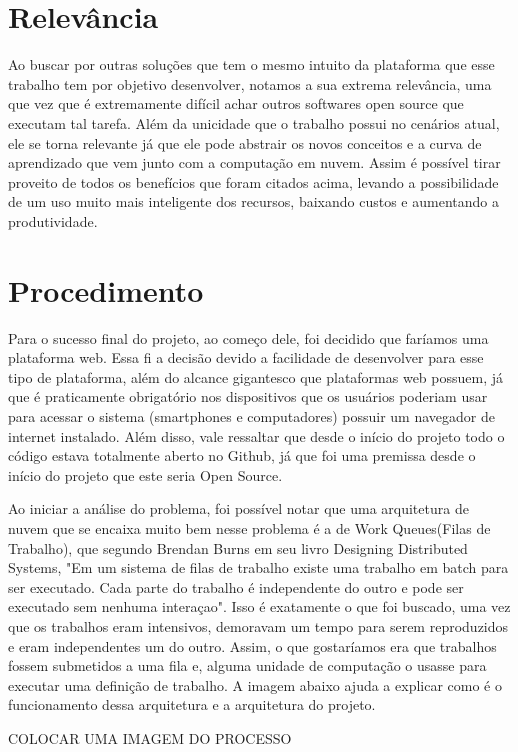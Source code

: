 \documentclass[11pt,twoside]{article}
\begin{document}
\section{Relevância}
Ao buscar por outras soluções que tem o mesmo intuito da plataforma que esse trabalho tem por objetivo desenvolver, notamos a sua extrema relevância, uma que vez que é extremamente difícil achar outros softwares
open source que executam tal tarefa.
Além da unicidade que o trabalho possui no cenários atual, ele se torna relevante já que ele pode abstrair os novos conceitos e a curva de aprendizado que vem junto com a computação em nuvem. Assim é possível
tirar proveito de todos os benefícios que foram citados acima, levando a possibilidade de um uso muito mais inteligente dos recursos, baixando custos e aumentando a produtividade.

\section{Procedimento}
Para o sucesso final do projeto, ao começo dele, foi decidido que faríamos uma plataforma web. Essa fi a decisão devido a facilidade de desenvolver para esse tipo de plataforma, além do alcance
gigantesco que plataformas web possuem, já que é praticamente obrigatório nos dispositivos que os usuários poderiam usar para acessar o sistema (smartphones e computadores) possuir um
navegador de internet instalado. Além disso, vale ressaltar que desde o início do projeto todo o código estava totalmente aberto no Github, já que foi uma premissa desde o início do projeto que este
seria Open Source.

Ao iniciar a análise do problema, foi possível notar que uma arquitetura de nuvem que se encaixa muito bem nesse problema é a de Work Queues(Filas de Trabalho), que segundo Brendan Burns em seu livro
Designing Distributed Systems, "Em um sistema de filas de trabalho existe uma trabalho em batch para ser executado. Cada parte do trabalho é independente do outro e pode ser executado sem nenhuma interaçao".
Isso é exatamente o que foi buscado, uma vez que os trabalhos eram intensivos, demoravam um tempo para serem reproduzidos e eram independentes um do outro. Assim, o que gostaríamos era que trabalhos fossem submetidos
a uma fila e, alguma unidade de computação o usasse para executar uma definição de trabalho. A imagem abaixo ajuda a explicar como é o funcionamento dessa arquitetura e a arquitetura do projeto.

COLOCAR UMA IMAGEM DO PROCESSO
\end{document}

